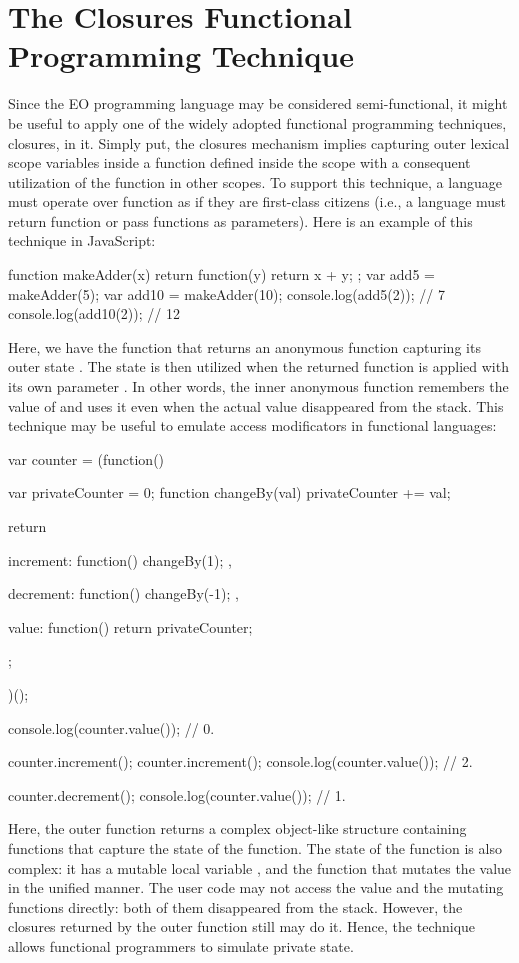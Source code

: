 \documentclass[12pt]{book}
\begin{document}
{{\section{The Closures Functional Programming Technique}
Since the EO programming language may be considered semi-functional, it might be useful to apply one of the widely adopted functional programming techniques, closures, in it. Simply put, the closures mechanism implies capturing outer lexical scope variables inside a function defined inside the scope with a consequent utilization of the function in other scopes. To support this technique, a language must operate over function as if they are first-class citizens (i.e., a language must return function or pass functions as parameters). Here is an example of this technique in JavaScript:

\begin{ffcode}
function makeAdder(x) {
  return function(y) {
    return x + y;
  };
}
var add5 = makeAdder(5);
var add10 = makeAdder(10);
console.log(add5(2));  // 7
console.log(add10(2)); // 12
\end{ffcode}

Here, we have the  function that returns an anonymous function capturing its outer state . The state is then utilized when the returned function is applied with its own parameter . In other words, the inner anonymous function remembers the value of  and uses it even when the actual value disappeared from the stack. This technique may be useful to emulate access modificators in functional languages:

\begin{ffcode}
var counter = (function() {
  var privateCounter = 0;
  function changeBy(val) {
    privateCounter += val;
  }

  return {
    increment: function() {
      changeBy(1);
    },

    decrement: function() {
      changeBy(-1);
    },

    value: function() {
      return privateCounter;
    }
  };
})();

console.log(counter.value());  // 0.

counter.increment();
counter.increment();
console.log(counter.value());  // 2.

counter.decrement();
console.log(counter.value());  // 1.
\end{ffcode}

Here, the outer function  returns a complex object-like structure containing functions that capture the state of the  function. The state of the  function is also complex: it has a mutable local variable , and the  function that mutates the value in the unified manner. The user code may not access the value and the mutating functions directly: both of them disappeared from the stack. However, the closures returned by the outer function still may do it. Hence, the technique allows functional programmers to simulate private state.

}}
\end{document}
